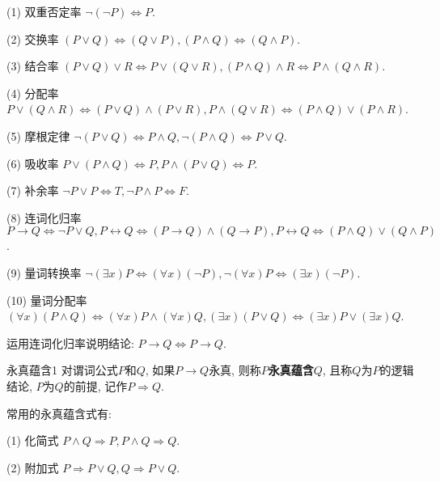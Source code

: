 (1) 双重否定率      $\neg(\neg P) \Leftrightarrow P$.

(2) 交换率               $(P\vee Q) \Leftrightarrow  (Q\vee P),  ( P\wedge Q) \Leftrightarrow  ( Q\wedge P)$.

(3) 结合率               $(P\vee Q)\vee R \Leftrightarrow  P\vee (Q\vee R),
               (P\wedge Q)\wedge R \Leftrightarrow  P\wedge (Q\wedge R)$.

(4) 分配率               $P\vee (Q\wedge R) \Leftrightarrow  (P\vee Q)\wedge (P\vee R),
               P\wedge (Q\vee R) \Leftrightarrow  (P\wedge Q)\vee (P\wedge R)$.

(5) 摩根定律        $\neg  (P\vee Q) \Leftrightarrow  P\wedge Q,
              \neg  (P\wedge Q) \Leftrightarrow P\vee Q$.

(6) 吸收率              $ P\vee (P\wedge Q) \Leftrightarrow P,
                P\wedge (P\vee Q) \Leftrightarrow P$.

(7) 补余率               $\neg P\vee P \Leftrightarrow  T, \neg  P\wedge P \Leftrightarrow  F$.

(8) 连词化归率      $ P\rightarrow Q \Leftrightarrow  \neg P\vee Q,
               P\longleftrightarrow Q \Leftrightarrow  (P\rightarrow Q)\wedge (Q\rightarrow P),
               P\longleftrightarrow Q \Leftrightarrow  (P\wedge Q)\vee (Q\wedge P)$.

(9) 量词转换率     $ \neg  (\exists x)P \Leftrightarrow  (\forall x)( \neg  P),
              \neg  (\forall x)P \Leftrightarrow  (\exists x) (\neg  P)$.

(10) 量词分配率    $(\forall x) (P\wedge Q) \Leftrightarrow  (\forall x)P\wedge (\forall x)Q, (\exists x) (P\vee Q) \Leftrightarrow  (\exists x)P\vee (\exists x)Q$.

\begin{newexam}
    运用连词化归率说明结论: $ P\rightarrow Q \Leftrightarrow P\rightarrow Q$.
\end{newexam}
\begin{mydef}{永真蕴含}{1}
对谓词公式$P$和$Q$, 如果$P\rightarrow Q$永真, 则称\textbf{$P$永真蕴含$Q$}, 且称$Q$为$P$的逻辑结论, $P$为$Q$的前提, 记作\textcolor[rgb]{0,0,1}{$P \Rightarrow Q$}.
\end{mydef}

常用的永真蕴含式有:

      (1) 化简式     $P\wedge Q \Rightarrow  P,   P\wedge Q \Rightarrow Q$.

      (2) 附加式     $P \Rightarrow P\vee Q,   Q \Rightarrow  P\vee Q$.

